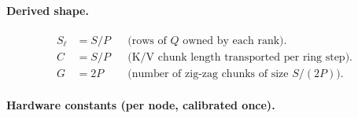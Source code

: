 \documentclass[11pt]{article}
\begin{document}
\paragraph{Derived shape.}
\begin{align}
  S_\ell &= S / P                        & &\text{(rows of $Q$ owned by each rank).} \\
  C       &= S / P                        & &\text{(K/V chunk length transported per ring step).} \\
  G       &= 2P                           & &\text{(number of zig-zag chunks of size $S/(2P)$).}
\end{align}

\paragraph{Hardware constants (per node, calibrated once).}
\end{document}
